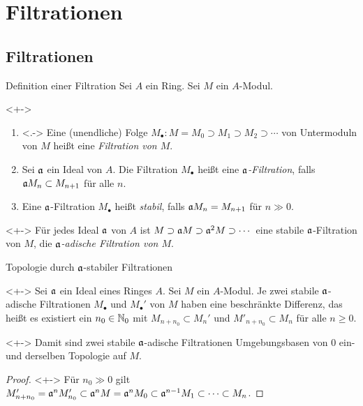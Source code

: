 \section{Filtrationen}

\subsection{Filtrationen}

\begin{frame}{Definition einer Filtration}
	Sei \(A\) ein Ring. Sei \(M\) ein \(A\)-Modul.
	\begin{definition}<+->
		\begin{enumerate}[<+->]
		\item<.->
			Eine (unendliche) Folge
			\(M_\bullet\colon M = M_0 \supset M_1 \supset M_2 \supset \dotsb\) von Untermoduln von
			\(M\) heißt eine \emph{Filtration von \(M\)}.
		\item
			Sei \(\mathfrak{a}\) ein Ideal von \(A\). Die Filtration \(M_\bullet\) heißt eine
			\emph{\(\mathfrak{a}\)-Filtration}, falls \(\mathfrak{a} M_n \subset M_{n + 1}\) für alle \(n\).
		\item
			Eine \(\mathfrak{a}\)-Filtration \(M_\bullet\) heißt \emph{stabil}, falls
			\(\mathfrak{a} M_n = M_{n + 1}\) für \(n \gg 0\).
		\end{enumerate}
	\end{definition}
	\begin{example}<+->
		Für jedes Ideal \(\mathfrak{a}\) von \(A\) ist \(M \supset \mathfrak{a} M \supset \mathfrak{a}^2 M \supset \dotsb\)
		eine stabile \(\mathfrak{a}\)-Filtration von \(M\), die \emph{\(\mathfrak{a}\)-adische Filtration von \(M\)}.
	\end{example}
\end{frame}

\begin{frame}{Topologie durch \(\mathfrak{a}\)-stabiler Filtrationen}
	\begin{lemma}<+->
		Sei \(\mathfrak{a}\) ein Ideal eines Ringes \(A\). Sei \(M\) ein \(A\)-Modul. Je
		zwei stabile \(\mathfrak{a}\)-adische Filtrationen \(M_\bullet\) und \(M_\bullet'\) 
		von \(M\) haben eine beschränkte Differenz, das heißt es existiert ein \(n_0 \in \mathbb N_0\) mit
		\(M_{n + n_0} \subset M_n'\) und \(M'_{n + n_0} \subset M_n\) für alle \(n \ge 0\).
	\end{lemma}
	\begin{visibleenv}<+->
		Damit sind zwei stabile \(\mathfrak{a}\)-adische Filtrationen Umgebungsbasen von \(0\) ein- und derselben
		Topologie auf \(M\).
	\end{visibleenv}
	\begin{proof}<+->
		Für \(n_0 \gg 0\) gilt
		\(M'_{n + n_0} = \mathfrak{a}^n M'_{n_0} \subset \mathfrak{a}^n M = \mathfrak{a}^n M_0 \subset \mathfrak{a}^{n - 1} M_1 \subset \dotsb
		\subset M_n\).
	\end{proof}
\end{frame}

